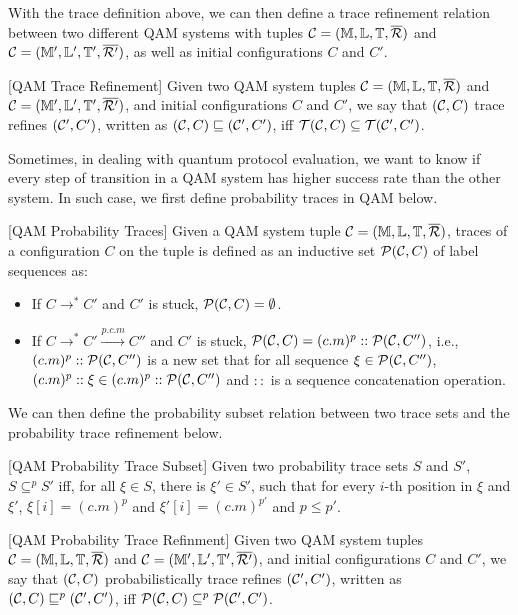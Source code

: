 With the trace definition above, we can then define a trace refinement relation between two different QAM systems with tuples $\mathcal{C}=(\mathbb{M},\mathbb{L},\mathbb{T},\overline{\mathcal{R}})$ and $\mathcal{C}=(\mathbb{M}',\mathbb{L}',\mathbb{T}',\overline{\mathcal{R}'})$, as well as initial configurations $C$ and $C'$.

\begin{definition}\label{def:traceeq}\rm[QAM Trace Refinement]
Given two QAM system tuples $\mathcal{C}=(\mathbb{M},\mathbb{L},\mathbb{T},\overline{\mathcal{R}})$ and $\mathcal{C}=(\mathbb{M}',\mathbb{L}',\mathbb{T}',\overline{\mathcal{R}'})$, and initial configurations $C$ and $C'$,  we say that $(\mathcal{C},C)$ trace refines $(\mathcal{C}',C')$, written as $(\mathcal{C},C) \sqsubseteq (\mathcal{C}',C')$, iff $\mathcal{T}(\mathcal{C},C)\subseteq \mathcal{T}(\mathcal{C}',C')$.

\end{definition}

Sometimes, in dealing with quantum protocol evaluation, we want to know if every step of transition in a QAM system has higher success rate than the other system. In such case, we first define probability traces in QAM below.

\begin{definition}\label{def:ptraces}\rm[QAM Probability Traces]
Given a QAM system tuple $\mathcal{C}=(\mathbb{M},\mathbb{L},\mathbb{T},\overline{\mathcal{R}})$, traces of a configuration $C$ on the tuple is defined as an inductive set $\mathcal{P}(\mathcal{C},C)$ of label sequences as:

\begin{itemize}
\item If $C \longrightarrow^* C'$ and $C'$ is stuck, $\mathcal{P}(\mathcal{C},C)=\emptyset$.
\item If $C \longrightarrow^* C' \xrightarrow{p.c.m} C''$ and $C'$ is stuck, $\mathcal{P}(\mathcal{C},C)=(c.m)^p::\mathcal{P}(\mathcal{C},C'')$, i.e., $(c.m)^p::\mathcal{P}(\mathcal{C},C'')$ is a new set that for all sequence $\xi \in \mathcal{P}(\mathcal{C},C'')$, $(c.m)^p::\xi \in (c.m)^p::\mathcal{P}(\mathcal{C},C'')$ and $::$ is a sequence concatenation operation.
\end{itemize}
\end{definition}

We can then define the probability subset relation between two trace sets and the probability trace refinement below.

\begin{definition}\label{def:ptracesub}\rm[QAM Probability Trace Subset]
Given two probability trace sets $S$ and $S'$, $S \subseteq^p S'$ iff, for all $\xi \in S$, there is $\xi' \in S'$, such that for every $i$-th position in $\xi$ and $\xi'$, $\xi[i]=(c.m)^p$ and $\xi'[i]=(c.m)^{p'}$ and $p \le p'$.

\end{definition}

\begin{definition}\label{def:ptracerefine}\rm[QAM Probability Trace Refinment]
Given two QAM system tuples $\mathcal{C}=(\mathbb{M},\mathbb{L},\mathbb{T},\overline{\mathcal{R}})$ and $\mathcal{C}=(\mathbb{M}',\mathbb{L}',\mathbb{T}',\overline{\mathcal{R}'})$, and initial configurations $C$ and $C'$,  we say that $(\mathcal{C},C)$ probabilistically trace refines $(\mathcal{C}',C')$, written as $(\mathcal{C},C) \sqsubseteq^p (\mathcal{C}',C')$, iff $\mathcal{P}(\mathcal{C},C)\subseteq^p \mathcal{P}(\mathcal{C}',C')$.

\end{definition}




